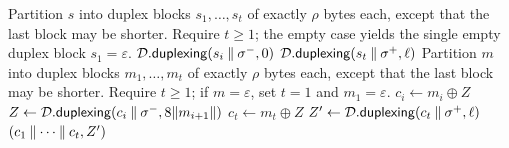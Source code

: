 \begin{algorithm}[t]
  \caption{TW128 helper procedures.}
  \label{alg:helpers}
  \begin{algorithmic}[1]
      \State Partition $s$ into duplex blocks $s_1, \dots, s_t$ of exactly
        $\rho$ bytes each, except that the last block may be shorter.
      \State Require $t \geq 1$; the empty case yields the single empty
        duplex block $s_1 = \varepsilon$.
        \State $\mathcal{D}.\mathsf{duplexing}(s_i \mathbin{\|} \sigma^-, 0)$
      \EndFor
      \State \Return $\mathcal{D}.\mathsf{duplexing}(s_t \mathbin{\|} \sigma^+, \ell)$
    \EndProcedure
    \Statex
      \State Partition $m$ into duplex blocks $m_1, \dots, m_t$ of exactly
        $\rho$ bytes each, except that the last block may be shorter.
      \State Require $t \geq 1$; if $m = \varepsilon$, set $t = 1$ and
        $m_1 = \varepsilon$.
        \State $c_i \gets m_i \oplus Z$
        \State $Z \gets \mathcal{D}.\mathsf{duplexing}(c_i \mathbin{\|} \sigma^-, 8\|m_{i+1}\|)$
      \EndFor
      \State $c_t \gets m_t \oplus Z$
      \State $Z' \gets \mathcal{D}.\mathsf{duplexing}(c_t \mathbin{\|} \sigma^+, \ell)$
      \State \Return $(c_1 \mathbin{\|} \cdots \mathbin{\|} c_t, Z')$
    \EndProcedure
  \end{algorithmic}
\end{algorithm}

